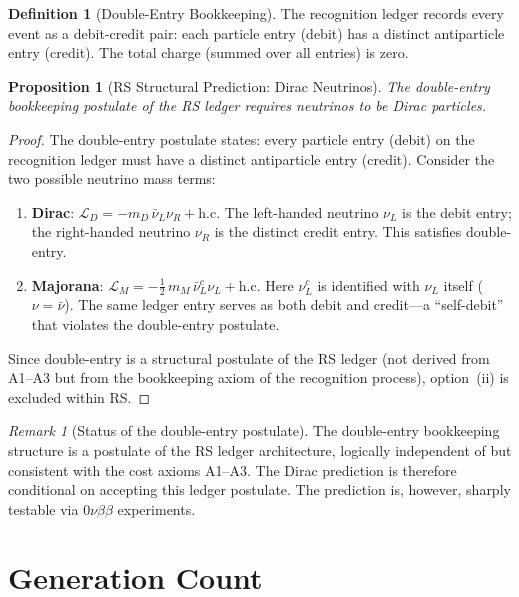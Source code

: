 \documentclass[12pt,a4paper]{article}
\newtheorem{proposition}[theorem]{Proposition}
\theoremstyle{definition}
\newtheorem{definition}[theorem]{Definition}
\theoremstyle{remark}
\newtheorem{remark}[theorem]{Remark}
\begin{document}
\begin{definition}[Double-Entry Bookkeeping]
The recognition ledger records every event as a debit-credit
pair: each particle entry (debit) has a distinct antiparticle
entry (credit).  The total charge (summed over all entries) is
zero.
\end{definition}

\begin{proposition}[RS Structural Prediction: Dirac Neutrinos]
\label{prop:dirac}
The double-entry bookkeeping postulate of the RS ledger requires
neutrinos to be Dirac particles.
\end{proposition}

\begin{proof}
The double-entry postulate states: every particle entry (debit) on
the recognition ledger must have a distinct antiparticle entry
(credit).  Consider the two possible neutrino mass terms:
\begin{enumerate}[label=(\roman*)]
  \item \textbf{Dirac}: $\mathcal{L}_D = -m_D\,
  \bar{\nu}_L \nu_R + \mathrm{h.c.}$  The left-handed neutrino
  $\nu_L$ is the debit entry; the right-handed neutrino $\nu_R$
  is the distinct credit entry.  This satisfies double-entry.

  \item \textbf{Majorana}: $\mathcal{L}_M = -\tfrac{1}{2}\,
  m_M\,\bar{\nu}_L^c \nu_L + \mathrm{h.c.}$  Here $\nu_L^c$ is
  identified with $\nu_L$ itself ($\nu = \bar{\nu}$).  The same
  ledger entry serves as both debit and credit---a ``self-debit''
  that violates the double-entry postulate.
\end{enumerate}
Since double-entry is a structural postulate of the RS ledger
(not derived from A1--A3 but from the bookkeeping axiom of the
recognition process), option~(ii) is excluded within RS.
\end{proof}

\begin{remark}[Status of the double-entry postulate]
The double-entry bookkeeping structure is a postulate of the RS
ledger architecture, logically independent of but consistent with
the cost axioms A1--A3.  The Dirac prediction is therefore
conditional on accepting this ledger postulate.  The prediction
is, however, sharply testable via $0\nu\beta\beta$ experiments.
\end{remark}

\section{Generation Count}
\label{sec:generations}
\end{document}
